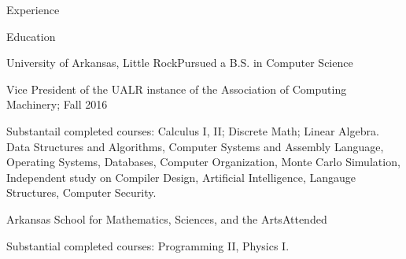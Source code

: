 \documentclass{resume} %
\begin{document}
\begin{rSection}{Experience}


\end{rSection}

\clearpage



\begin{rSection}{Education}

\begin{rSubsection}{University of Arkansas, Little Rock}{}{Pursued a B.S. in Computer Science}

	\item Vice President of the UALR instance of the Association of Computing Machinery; Fall 2016
	\item Substantail completed courses: Calculus I, II; Discrete Math; Linear Algebra. Data Structures and Algorithms, Computer Systems and Assembly Language, Operating Systems, Databases, Computer Organization, Monte Carlo Simulation, Independent study on Compiler Design, Artificial Intelligence, Langauge Structures, Computer Security.
\end{rSubsection}

\begin{rSubsection}{Arkansas School for Mathematics, Sciences, and the Arts}{}{Attended}

	\item Substantial completed courses: Programming II, Physics I.
\end{rSubsection}

\end{rSection}
\end{document}
